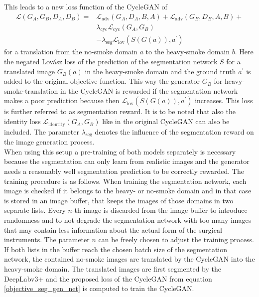 This leads to a new loss function of the CycleGAN of
\begin{equation}
    \begin{split}
    \mathcal{L}(G_A, G_B, D_A, D_B) = & \mathcal{L}_{\text{adv}}(G_A,D_A,B,A) + \mathcal{L}_{\text{adv}}(G_B,D_B,A,B) + \\
                                      &  \lambda_{\text{cyc}} \mathcal{L}_{\text{cyc}}(G_A, G_B) \\
                                      &  - \lambda_{\text{seg}}\mathcal{L}_{\text{lov}}(S(G(a)), a^\prime)
\end{split}
\label{objective_seg_gen_net}
\end{equation}
for a translation from the no-smoke domain $a$ to the heavy-smoke domain $b$.
Here the negated Lovász loss of the prediction of the segmentation network $S$ for a translated image $G_B(a)$ in the heavy-smoke domain and the ground truth $a^\prime$ is added to the original objective function. 
This way the generator $G_B$ for heavy-smoke-translation in the CycleGAN is rewarded if the segmentation network makes a poor prediction because then $\mathcal{L}_{\text{lov}}(S(G(a)), a^\prime)$ increases.
This loss is further referred to as segmentation reward.
It is to be noted that also the identity loss $\mathcal{L}_{\text{identity}}(G_A, G_B)$ like in the original CycleGAN can also be included.
The parameter $\lambda_{\text{seg}}$ denotes the influence of the segmentation reward on the image generation process.\\
When using this setup a pre-training of both models separately is necessary because the segmentation can only learn from realistic images and the generator needs a reasonably well segmentation prediction to be correctly rewarded.
The training procedure is as follows.
When training the segmentation network, each image is checked if it belongs to the heavy- or no-smoke domain and in that case is stored in an image buffer, that keeps the images of those domains in two separate lists.
Every $n$-th image is discarded from the image buffer to introduce randomness and to not degrade the segmentation network with too many images that may contain less information about the actual form of the surgical instruments.
The parameter $n$ can be freely chosen to adjust the training process.
If both lists in the buffer reach the chosen batch size of the segmentation network, the contained no-smoke images are translated by the CycleGAN into the heavy-smoke domain.
The translated images are first segmented by the DeepLabv3+ and the proposed loss of the CycleGAN from equation \ref{objective_seg_gen_net} is computed to train the CycleGAN.
